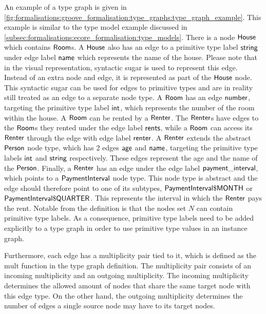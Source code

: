 An example of a type graph is given in \cref{fig:formalisations:groove_formalisation:type_graphs:type_graph_example}. This example is similar to the type model example discussed in \cref{subsec:formalisations:ecore_formalisation:type_models}. There is a node $\mathsf{House}$ which contains $\mathsf{Room}$s. A $\mathsf{House}$ also has an edge to a primitive type label $\mathsf{string}$ under edge label $\mathsf{name}$ which represents the name of the house. Please note that in the visual representation, syntactic sugar is used to represent this edge. Instead of an extra node and edge, it is represented as part of the $\mathsf{House}$ node. This syntactic sugar can be used for edges to primitive types and are in reality still treated as an edge to a separate node type. A $\mathsf{Room}$ has an edge $\mathsf{number}$, targeting the primitive type label $\mathsf{int}$, which represents the number of the room within the house. A $\mathsf{Room}$ can be rented by a $\mathsf{Renter}$. The $\mathsf{Renter}$s have edges to the $\mathsf{Room}$s they rented under the edge label $\mathsf{rents}$, while a $\mathsf{Room}$ can access its $\mathsf{Renter}$ through the edge with edge label $\mathsf{renter}$. A $\mathsf{Renter}$ extends the abstract $\mathsf{Person}$ node type, which has 2 edges $\mathsf{age}$ and $\mathsf{name}$, targeting the primitive type labels $\mathsf{int}$ and $\mathsf{string}$ respectively. These edges represent the age and the name of the $\mathsf{Person}$. Finally, a $\mathsf{Renter}$ has an edge under the edge label $\mathsf{payment\_interval}$, which points to a $\mathsf{PaymentInterval}$ node type. This node type is abstract and the edge should therefore point to one of its subtypes, $\mathsf{PaymentInterval\$MONTH}$ or $\mathsf{PaymentInterval\$QUARTER}$. This represents the interval in which the $\mathsf{Renter}$ pays the rent. 
Notable from the definition is that the nodes set $N$ can contain primitive type labels. As a consequence, primitive type labels need to be added explicitly to a type graph in order to use primitive type values in an instance graph.

Furthermore, each edge has a multiplicity pair tied to it, which is defined as the $\mathrm{mult}$ function in the type graph definition. The multiplicity pair consists of an incoming multiplicity and an outgoing multiplicity. The incoming multiplicity determines the allowed amount of nodes that share the same target node with this edge type. On the other hand, the outgoing multiplicity determines the number of edges a single source node may have to its target nodes.


